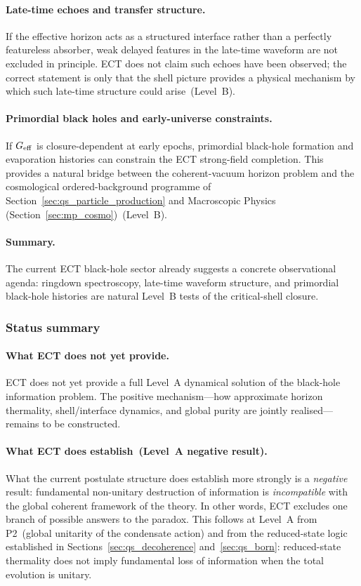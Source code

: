 \documentclass[11pt,a4paper]{article}
\numberwithin{equation}{section}
\begin{document}
\paragraph{Late-time echoes and transfer structure.}
If the effective horizon acts as a structured interface rather than a
perfectly featureless absorber, weak delayed features in the late-time
waveform are not excluded in principle.
ECT does not claim such echoes have been observed; the correct statement
is only that the shell picture provides a physical mechanism by which
such late-time structure could arise~(Level~B).

\paragraph{Primordial black holes and early-universe constraints.}
If $G_{\rm eff}$ is closure-dependent at early epochs, primordial
black-hole formation and evaporation histories can constrain the ECT
strong-field completion.
This provides a natural bridge between the coherent-vacuum horizon
problem and the cosmological ordered-background programme of
Section~\ref{sec:qs_particle_production} and Macroscopic Physics
(Section~\ref{sec:mp_cosmo})~(Level~B).

\paragraph{Summary.}
The current ECT black-hole sector already suggests a concrete
observational agenda: ringdown spectroscopy, late-time waveform
structure, and primordial black-hole histories are natural Level~B
tests of the critical-shell closure.

\subsubsection*{Status summary}

\paragraph{What ECT does not yet provide.}
ECT does not yet provide a full Level~A dynamical solution of the
black-hole information problem.
The positive mechanism---how approximate horizon thermality,
shell/interface dynamics, and global purity are jointly
realised---remains to be constructed.

\paragraph{What ECT does establish~(Level~A negative result).}
What the current postulate structure does establish more strongly
is a \emph{negative} result:
fundamental non-unitary destruction of information is
\emph{incompatible} with the global coherent framework of the theory.
In other words, ECT excludes one branch of possible answers to the
paradox.
This follows at Level~A from P2~(global unitarity of the condensate
action) and from the reduced-state logic established in
Sections~\ref{sec:qs_decoherence} and~\ref{sec:qs_born}:
reduced-state thermality does not imply fundamental loss of
information when the total evolution is unitary.
\end{document}
